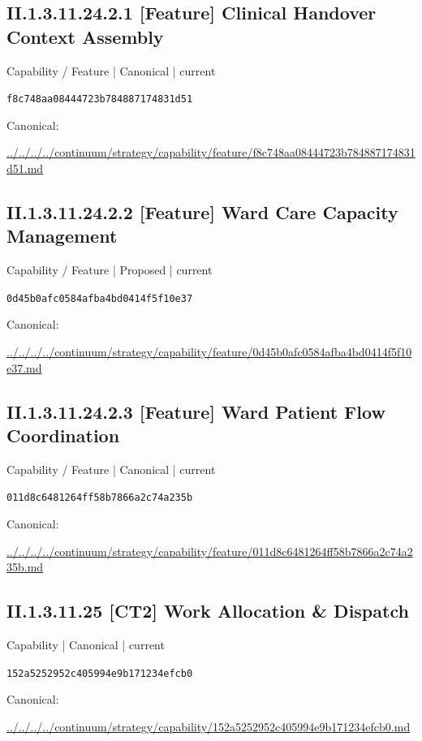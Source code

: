 \documentclass[10pt,a4paper]{article}
\begin{document}
\subsection*{II.1.3.11.24.2.1 [Feature] Clinical Handover Context Assembly}
{\small Capability / Feature | Canonical | current}\par
\texttt{f8c748aa08444723b784887174831d51}\par
Canonical: \par
{\footnotesize\url{../../../../continuum/strategy/capability/feature/f8c748aa08444723b784887174831d51.md}}\par
\subsection*{II.1.3.11.24.2.2 [Feature] Ward Care Capacity Management}
{\small Capability / Feature | Proposed | current}\par
\texttt{0d45b0afc0584afba4bd0414f5f10e37}\par
Canonical: \par
{\footnotesize\url{../../../../continuum/strategy/capability/feature/0d45b0afc0584afba4bd0414f5f10e37.md}}\par
\subsection*{II.1.3.11.24.2.3 [Feature] Ward Patient Flow Coordination}
{\small Capability / Feature | Canonical | current}\par
\texttt{011d8c6481264ff58b7866a2c74a235b}\par
Canonical: \par
{\footnotesize\url{../../../../continuum/strategy/capability/feature/011d8c6481264ff58b7866a2c74a235b.md}}\par
\subsection*{II.1.3.11.25 [CT2] Work Allocation \& Dispatch}
{\small Capability | Canonical | current}\par
\texttt{152a5252952c405994e9b171234efcb0}\par
Canonical: \par
{\footnotesize\url{../../../../continuum/strategy/capability/152a5252952c405994e9b171234efcb0.md}}\par
\end{document}
